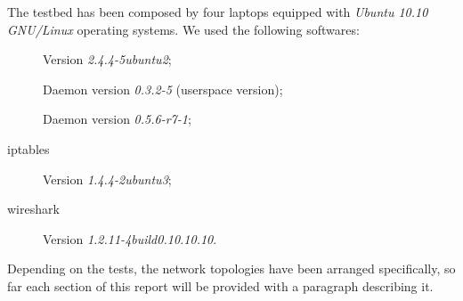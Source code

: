     The testbed has been composed by four laptops equipped with
    \emph{Ubuntu 10.10 GNU/Linux} operating systems. We used the following
    softwares:
    \begin{description}
    \item[\netperf] Version \emph{2.4.4-5ubuntu2};
    \item[\batman] Daemon version \emph{0.3.2-5} (userspace version);
    \item[\olsr] Daemon version \emph{0.5.6-r7-1};
    \item[iptables] Version \emph{1.4.4-2ubuntu3};
    \item[wireshark] Version \emph{1.2.11-4build0.10.10.10}.
    \end{description}

    Depending on the tests, the network topologies have been arranged
    specifically, so far each section of this report will be provided with
    a paragraph describing it.

